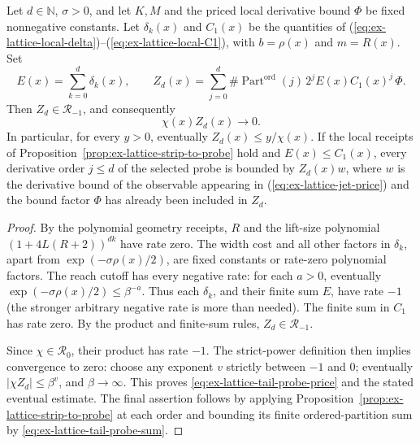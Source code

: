 \begin{lemma}
\label{lem:ex-lattice-tail-pays-probe}
Let \(d\in\mathbb N\), \(\sigma>0\), and let \(K,M\) and the priced
local derivative bound \(\Phi\) be fixed nonnegative constants. Let
\(\delta_k(x)\) and \(C_1(x)\) be the quantities of
(\ref{eq:ex-lattice-local-delta})--(\ref{eq:ex-lattice-local-C1}), with
\(b=\rho(x)\) and \(m=R(x)\). Set
\begin{equation}
 E(x)=\sum_{k=0}^{d}\delta_k(x),\qquad
 Z_d(x)=\sum_{j=0}^{d}\#\operatorname{Part}^{\mathrm{ord}}(j)\,2^j
       E(x)C_1(x)^j\,\Phi.
 \label{eq:ex-lattice-tail-probe-sum}
\end{equation}
Then \(Z_d\in\mathcal R_{-1}\), and consequently
\begin{equation}
                 \chi(x)Z_d(x)\longrightarrow0.
 \label{eq:ex-lattice-tail-probe-price}
\end{equation}
In particular, for every \(y>0\), eventually
\(Z_d(x)\le y/\chi(x)\). If the local receipts of
Proposition~\ref{prop:ex-lattice-strip-to-probe} hold and
\(E(x)\le C_1(x)\), every derivative order \(j\le d\) of the selected
probe is bounded by \(Z_d(x)w\), where \(w\) is the derivative bound of
the observable appearing in (\ref{eq:ex-lattice-jet-price}) and
the bound factor \(\Phi\) has already been included in \(Z_d\).
\end{lemma}
\begin{proof}
By the polynomial geometry receipts, \(R\) and the lift-size polynomial
\((1+4L(R+2))^{dk}\) have rate zero. The width cost and all other factors
in \(\delta_k\), apart from \(\exp(-\sigma\rho(x)/2)\), are fixed constants
or rate-zero polynomial factors. The reach cutoff has every negative rate:
for each \(a>0\), eventually \(\exp(-\sigma\rho(x)/2)\le\beta^{-a}\).
Thus each \(\delta_k\), and their finite sum \(E\), have rate \(-1\)
(the stronger arbitrary negative rate is more than needed). The finite sum
in \(C_1\) has rate zero. By the product and finite-sum rules,
\(Z_d\in\mathcal R_{-1}\).

Since \(\chi\in\mathcal R_0\), their product has rate \(-1\). The
strict-power definition then implies convergence to zero: choose any
exponent \(v\) strictly between \(-1\) and \(0\); eventually
\(|\chi Z_d|\le\beta^v\), and \(\beta\to\infty\). This proves \eqref{eq:ex-lattice-tail-probe-price}
and the stated eventual estimate. The final assertion follows by
applying Proposition~\ref{prop:ex-lattice-strip-to-probe} at each order and
bounding its finite ordered-partition sum by \eqref{eq:ex-lattice-tail-probe-sum}.
\end{proof}

